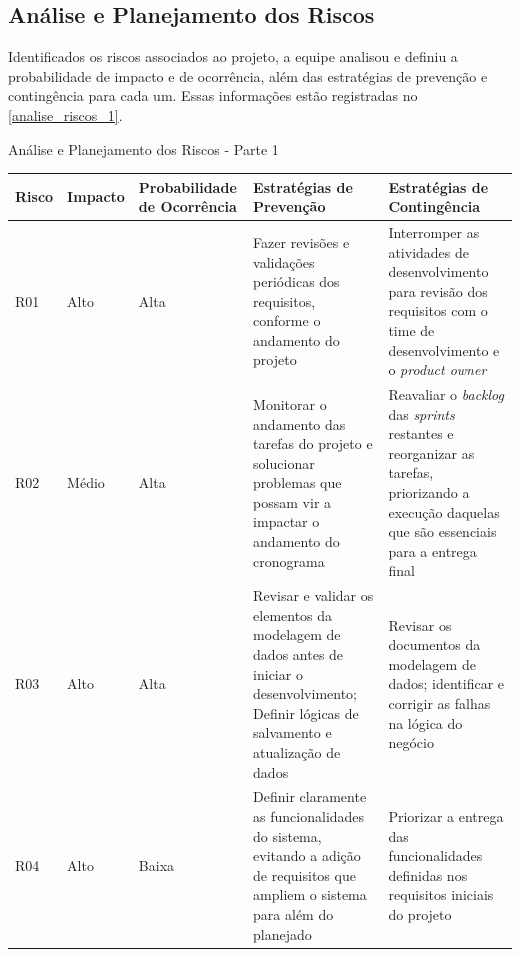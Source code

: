 \documentclass[
	12pt,				%
	openany,			%
	oneside,			%
	a4paper,			%
	english,			%
	french,				%
	spanish,			%
	brazil				%
	]{abntex2}
\begin{document}
\subsection{Análise e Planejamento dos Riscos}
Identificados os riscos associados ao projeto, a equipe analisou e definiu a probabilidade de impacto e de ocorrência, além das estratégias de prevenção e contingência para cada um. Essas informações estão registradas no \autoref{analise_riscos_1}. \\
%
\begin{quadro}[H]
	\caption{Análise e Planejamento dos Riscos - Parte 1}
	\label{analise_riscos_1} 
	\begin{tabular}{|>{\centering\arraybackslash}m{1cm}|>{\centering\arraybackslash}m{1.8cm}|>{\centering\arraybackslash}m{3cm}|>{\raggedright\arraybackslash}m{4.2cm}|>{\raggedright\arraybackslash}m{4.2cm}|}
		\hline
		\textbf{Risco} & \textbf{Impacto} & \textbf{Probabilidade de \newline Ocorrência} & \textbf{Estratégias de \newline Prevenção} & \textbf{Estratégias de \newline Contingência}\\
		\hline
		R01 & Alto & Alta &
		Fazer revisões e validações periódicas dos requisitos, conforme o andamento do projeto  & Interromper as atividades de desenvolvimento para revisão dos requisitos com o time de desenvolvimento e o \textit{product owner}
		\\ 
		\hline
		R02 & Médio & Alta &
		Monitorar o andamento das tarefas do projeto e solucionar problemas que possam vir a impactar o andamento do cronograma  & Reavaliar o \textit {backlog} das \textit{sprints} restantes e reorganizar as tarefas, priorizando a execução daquelas que são essenciais para a entrega final \\
		\hline
		R03 & Alto & Alta &
		Revisar e validar os elementos da modelagem de dados antes de iniciar o desenvolvimento; Definir lógicas de salvamento e atualização de dados  & Revisar os documentos da modelagem de dados;  identificar e corrigir as falhas na lógica do negócio \\
		\hline
		R04 & Alto & Baixa &
		Definir claramente as funcionalidades do sistema, evitando a adição de requisitos que ampliem o sistema para além do planejado  & Priorizar a entrega das funcionalidades definidas nos requisitos iniciais do projeto \\
		\hline
	\end{tabular}
\end{quadro}
\end{document}
